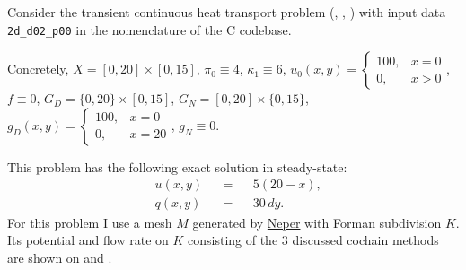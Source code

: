 \begin{example}
  \label{cmc/diffusion/continuous/transient/examples/2d_d02_p00-example}
  Consider the transient continuous heat transport problem
  (,
   ,
   )
  with input data \verb|2d_d02_p00| in the nomenclature of the C codebase.

  Concretely,
    $X = [0, 20] \times [0, 15]$,
    $\pi_0 \equiv 4$,
    $\kappa_1 \equiv 6$,
    $u_0(x, y) = \begin{cases} 100, & x = 0 \\ 0, & x > 0 \end{cases}$,
    $f \equiv 0$,
    $G_D = \{0, 20\} \times [0, 15]$,
    $G_N = [0, 20] \times \{0, 15\}$,
    $g_D(x, y) = \begin{cases} 100, & x = 0 \\ 0, & x = 20 \end{cases}$,
    $g_N \equiv 0$.

  This problem has the following exact solution in steady-state:
  \begin{subequations}
    \begin{alignat}{3}
      & u(x, y) && = && 5 (20 - x), \\
      & q(x, y) && = && 30 \, d y.
    \end{alignat}
  \end{subequations}
  For this problem I use a mesh $M$ generated by
  \href{https://neper.info/}{Neper} with Forman subdivision $K$.
  Its potential and flow rate on $K$ consisting of the $3$ discussed cochain
  methods are shown on
  and
  .
\end{example}
